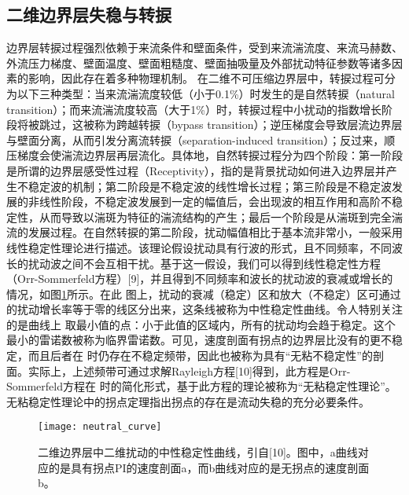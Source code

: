 \subsection{二维边界层失稳与转捩}
边界层转捩过程强烈依赖于来流条件和壁面条件，受到来流湍流度、来流马赫数、外流压力梯度、壁面温度、壁面粗糙度、壁面抽吸量及外部扰动特征参数等诸多因素的影响\cite{morkovin1969many}，因此存在着多种物理机制。
在二维不可压缩边界层中，转捩过程可分为以下三种类型：当来流湍流度较低（小于0.1\%）时发生的是自然转捩（natural transition）\cite{papanastasiou1999viscous}；而来流湍流度较高（大于1\%）时，转捩过程中小扰动的指数增长阶段将被跳过，这被称为跨越转捩（bypass transition）\cite{jacobs2001simulations}；逆压梯度会导致层流边界层与壁面分离，从而引发分离流转捩（separation-induced transition）\cite{malkiel1995transition}；反过来，顺压梯度会使湍流边界层再层流化\cite{walker1992role}。具体地，自然转捩过程分为四个阶段\cite{bradshaw1994turbulence}：第一阶段是所谓的边界层感受性过程（Receptivity）\cite{reshotko1984environment}，指的是背景扰动如何进入边界层并产生不稳定波的机制；第二阶段是不稳定波的线性增长过程；第三阶段是不稳定波发展的非线性阶段，不稳定波发展到一定的幅值后，会出现波的相互作用和高阶不稳定性，从而导致以湍斑为特征的湍流结构的产生；最后一个阶段是从湍斑到完全湍流的发展过程。在自然转捩的第二阶段，扰动幅值相比于基本流非常小，一般采用线性稳定性理论进行描述。该理论假设扰动具有行波的形式，且不同频率，不同波长的扰动波之间不会互相干扰。基于这一假设，我们可以得到线性稳定性方程（Orr-Sommerfeld方程）[9]，并且得到不同频率和波长的扰动波的衰减或增长的情况，如图\ref{f:neutral_curve}所示。在此 图上，扰动的衰减（稳定）区和放大（不稳定）区可通过的扰动增长率等于零的线区分出来，这条线被称为中性稳定性曲线。令人特别关注的是曲线上 取最小值的点：小于此值的区域内，所有的扰动均会趋于稳定。这个最小的雷诺数被称为临界雷诺数。可见，速度剖面有拐点的边界层比没有的更不稳定，而且后者在 时仍存在不稳定频带，因此也被称为具有“无粘不稳定性”的剖面。实际上，上述频带可通过求解Rayleigh方程[10]得到，此方程是Orr-Sommerfeld方程在 时的简化形式，基于此方程的理论被称为“无粘稳定性理论”。无粘稳定性理论中的拐点定理指出拐点的存在是流动失稳的充分必要条件。
\begin{figure}
  \centering
  \texttt{[image: neutral\_curve]}
  \caption{二维边界层中二维扰动的中性稳定性曲线，引自[10]。图中，a曲线对应的是具有拐点PI的速度剖面a，而b曲线对应的是无拐点的速度剖面b。}\label{f:neutral_curve}
\end{figure}

